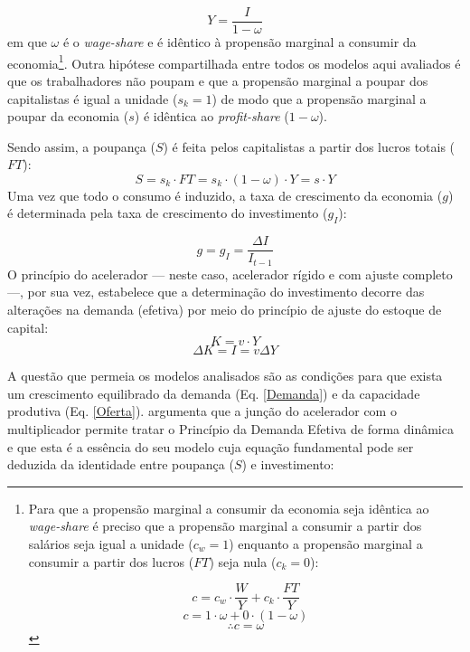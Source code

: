 \begin{equation}
\label{Demanda}
Y = \frac{I}{1-\omega}
\end{equation}
em que $\omega$ é o \textit{wage-share} e é idêntico à propensão marginal a consumir da economia\footnote{
	Para que a propensão marginal a consumir da economia seja idêntica ao \textit{wage-share} é preciso que a propensão marginal a consumir a partir dos salários seja igual  a unidade ($c_w = 1$) enquanto a propensão marginal a consumir a partir dos lucros ($FT$) seja nula ($c_k = 0$):
	
	$$
	c = c_w\cdot \frac{W}{Y} + c_k\cdot \frac{FT}{Y}
	$$
	$$
	c = 1\cdot \omega + 0\cdot (1-\omega)
	$$
	$$
	\therefore c = \omega
	$$
	
}.
Outra hipótese compartilhada entre todos os modelos aqui avaliados é que os trabalhadores não poupam e que a propensão marginal a poupar dos capitalistas é igual a unidade ($s_k = 1$) de modo que a propensão marginal a poupar da economia ($s$) é idêntica ao \textit{profit-share} ($1-\omega$).

Sendo assim, a poupança ($S$) é feita pelos capitalistas a partir dos lucros totais ($FT$):
$$
S = s_k\cdot FT = s_k\cdot (1-\omega)\cdot Y = s\cdot Y
$$
Uma vez que todo o consumo é induzido, a taxa de crescimento da economia ($g$) é determinada pela taxa de crescimento do investimento ($g_I$):

\begin{equation}
\label{crescimento_efetivo}
	g = g_I =  \frac{\Delta I}{I_{t-1}}
\end{equation}
O princípio do acelerador --- neste caso, acelerador rígido e com ajuste completo ---, por sua vez, estabelece que a determinação do investimento decorre das alterações na demanda (efetiva) por meio do princípio de ajuste do estoque de capital:
$$
K = v\cdot Y
$$
\begin{equation}
\Delta K = I = v\Delta Y
\end{equation}


A questão que permeia os modelos analisados são as condições para que exista um crescimento equilibrado da demanda (Eq. \ref{Demanda}) e da capacidade produtiva (Eq. \ref{Oferta}). 
\textcite{harrod_essay_1939} argumenta que a junção do acelerador com o multiplicador permite tratar o Princípio da Demanda Efetiva de forma dinâmica e que esta é a essência do seu modelo cuja equação fundamental pode ser deduzida da identidade entre poupança ($S$) e investimento:

